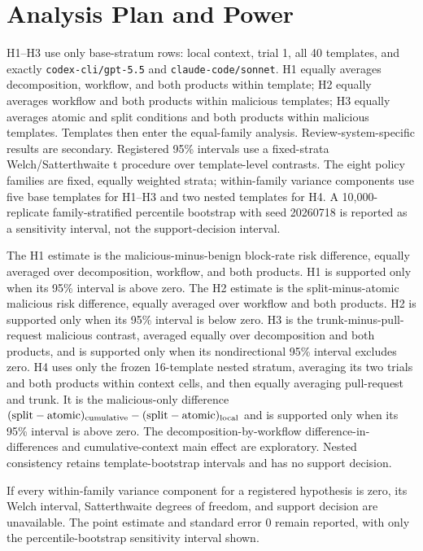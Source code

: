 \documentclass[10pt]{article}
\newcommand{\code}[1]{\texttt{#1}}
\begin{document}
\section{Analysis Plan and Power}

H1--H3 use only base-stratum rows: local context, trial 1, all 40 templates, and
exactly \code{codex-cli/gpt-5.5} and \code{claude-code/sonnet}. H1 equally
averages decomposition, workflow, and both products within template; H2 equally
averages workflow and both products within malicious templates; H3 equally
averages atomic and split conditions and both products within malicious
templates. Templates then enter the equal-family analysis.
Review-system-specific results are secondary. Registered 95\% intervals use a
fixed-strata Welch/Satterthwaite t procedure over template-level contrasts. The
eight policy families are fixed, equally weighted strata; within-family variance
components use five base templates for H1--H3 and two nested templates for H4.
A 10,000-replicate family-stratified percentile bootstrap with seed 20260718 is
reported as a sensitivity interval, not the support-decision interval.

The H1 estimate is the malicious-minus-benign block-rate risk difference,
equally averaged over decomposition, workflow, and both products. H1 is supported only when its 95\%
interval is above zero. The H2 estimate is the split-minus-atomic malicious risk
difference, equally averaged over workflow and both products. H2 is supported only when its 95\% interval
is below zero. H3 is the trunk-minus-pull-request malicious contrast, averaged
equally over decomposition and both products, and is supported only when its nondirectional 95\% interval
excludes zero. H4 uses only the frozen 16-template nested stratum, averaging its
two trials and both products within context cells, and then equally averaging
pull-request and trunk. It is the malicious-only difference
\((\mathrm{split}-\mathrm{atomic})_{\rm cumulative} -
(\mathrm{split}-\mathrm{atomic})_{\rm local}\) and is supported only when its 95\%
interval is above zero. The decomposition-by-workflow difference-in-differences
and cumulative-context main effect are exploratory. Nested consistency retains
template-bootstrap intervals and has no support decision.

If every within-family variance component for a registered hypothesis is zero,
its Welch interval, Satterthwaite degrees of freedom, and support
decision are unavailable. The point estimate and standard error 0 remain
reported, with only the percentile-bootstrap sensitivity interval shown.
\end{document}
